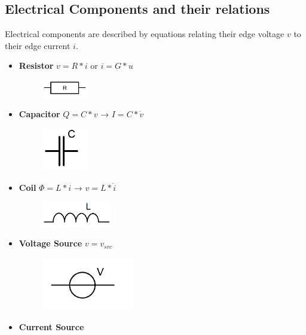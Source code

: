 \documentclass[11pt,titlepage]{article}
\begin{document}
		\subsection{Electrical Components and their relations}
			Electrical components are described by equations relating their edge voltage $v$ to their edge current $i$.
			\begin{itemize}
				\item \textbf{Resistor} \newline
					$v = R*i$ or $i = G*u$
					\begin{figure}[H]
						\centering
						\includegraphics[width=2cm]{pictures/resistor.png}
					\end{figure}
				\item \textbf{Capacitor} \newline
					$Q = C * v$ → $I = C*\dot{v}$
					\begin{figure}[H]
						\centering
						\includegraphics[width=2cm]{pictures/capacitor.png}
					\end{figure}
				\item \textbf{Coil} \newline
					$\Phi = L*i$ → $v = L*\dot{i}$
					\begin{figure}[H]
						\centering
						\includegraphics[width=3cm]{pictures/coil.png}
					\end{figure}
				\item \textbf{Voltage Source} \newline
					$v = v_{src}$
					\begin{figure}[H]
						\centering
						\includegraphics[width=4cm]{pictures/voltage_source.png}
					\end{figure}
				\item \textbf{Current Source} \newline

\end{itemize}
\end{document}
